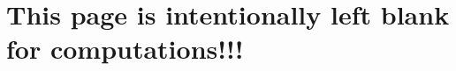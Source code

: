 \documentclass[10pt, addpoints]{exam}
\theoremstyle{definition}
\begin{document}
\newpage
\section*{This page is intentionally left blank for computations!!!}
%
\end{document}
